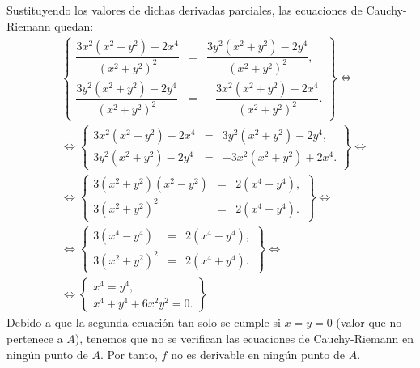 \begin{ejercicio}
\begin{enumerate}
\begin{itemize}
            Sustituyendo los valores de dichas derivadas parciales, las ecuaciones de Cauchy-Riemann quedan:
            \begin{align*}
                &\left\{
                    \begin{array}{rcl}
                        \dfrac{3x^2(x^2+y^2)-2x^4}{(x^2+y^2)^2} &=& \dfrac{3y^2(x^2+y^2)-2y^4}{(x^2+y^2)^2},\\
                        \dfrac{3y^2(x^2+y^2)-2y^4}{(x^2+y^2)^2} &=& -\dfrac{3x^2(x^2+y^2)-2x^4}{(x^2+y^2)^2}.
                    \end{array}
                \right\}
                \iff\\&\iff
                \left\{
                    \begin{array}{rcl}
                        3x^2(x^2+y^2)-2x^4 &=& 3y^2(x^2+y^2)-2y^4,\\
                        3y^2(x^2+y^2)-2y^4 &=& -3x^2(x^2+y^2)+2x^4.
                    \end{array}
                \right\}
                \iff\\&\iff
                \left\{
                    \begin{array}{rcl}
                        3(x^2+y^2)(x^2-y^2)&=& 2(x^4-y^4),\\
                        3(x^2+y^2)^2&=& 2(x^4+y^4).
                    \end{array}
                \right\}
                \iff\\&\iff
                \left\{
                    \begin{array}{rcl}
                        3(x^4-y^4)&=& 2(x^4-y^4),\\
                        3(x^2+y^2)^2&=& 2(x^4+y^4).
                    \end{array}
                \right\}
                \iff\\&\iff
                \left\{
                    \begin{array}{rcl}
                        x^4=y^4,\\
                        x^4+y^4+6x^2y^2=0.
                    \end{array}
                \right\}
            \end{align*}
            Debido a que la segunda ecuación tan solo se cumple si $x=y=0$ (valor que no pertenece a $A$), tenemos que no se verifican las ecuaciones de Cauchy-Riemann en ningún punto de $A$. Por tanto, $f$ no es derivable en ningún punto de $A$.


\end{itemize}
\end{enumerate}
\end{ejercicio}
